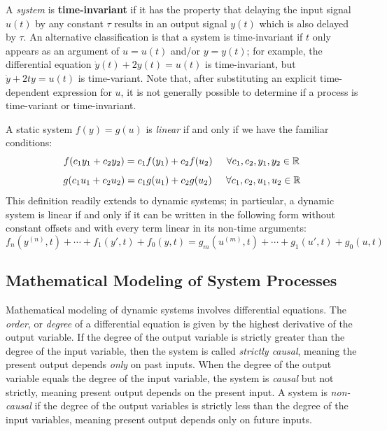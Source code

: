 A \textit{system} is \textbf{time-invariant} if it has the property that delaying the input signal $u(t)$ by any constant $\tau$ results in an output signal $y(t)$ which is also delayed by $\tau$. An alternative classification is that a system is time-invariant if $t$ only appears as an argument of $u=u(t)$ and/or $y=y(t)$; for example, the differential equation $\dot y(t) + 2y(t) = u(t)$ is time-invariant, but $\dot y + 2ty = u(t)$ is time-variant. Note that, after substituting an explicit time-dependent expression for $u$, it is not generally possible to determine if a process is time-variant or time-invariant.

A static system $f(y)=g(u)$ is \textit{linear} if and only if we have the familiar conditions: \[f(c_1y_1 + c_2y_2) = c_1f(y_1) + c_2f(u_2)\hspace{0.2in} \forall c_1,c_2,y_1,y_2\in\mathbb{R}\]
\[g(c_1u_1 + c_2u_2) = c_1g(u_1) + c_2g(u_2)\hspace{0.2in} \forall c_1,c_2,u_1,u_2\in\mathbb{R}\] This definition readily extends to dynamic systems; in particular, a dynamic system is linear if and only if it can be written in the following form without constant offsets and with every term linear in its non-time arguments: \[f_n(y^{(n)},t) + \cdots + f_1(y',t) + f_0(y,t) = g_m(u^{(m)},t) + \cdots + g_1(u',t) + g_0(u,t)\]

\subsection{Mathematical Modeling of System Processes}


Mathematical modeling of dynamic systems involves differential equations. The \textit{order}, or \textit{degree} of a differential equation is given by the highest derivative of the output variable. If the degree of the output variable is strictly greater than the degree of the input variable, then the system is called \textit{strictly causal}, meaning the present output depends \textit{only} on past inputs. When the degree of the output variable equals the degree of the input variable, the system is \textit{causal} but not strictly, meaning present output depends on the present input. A system is \textit{non-causal} if the degree of the output variables is strictly less than the degree of the input variables, meaning present output depends only on future inputs.

